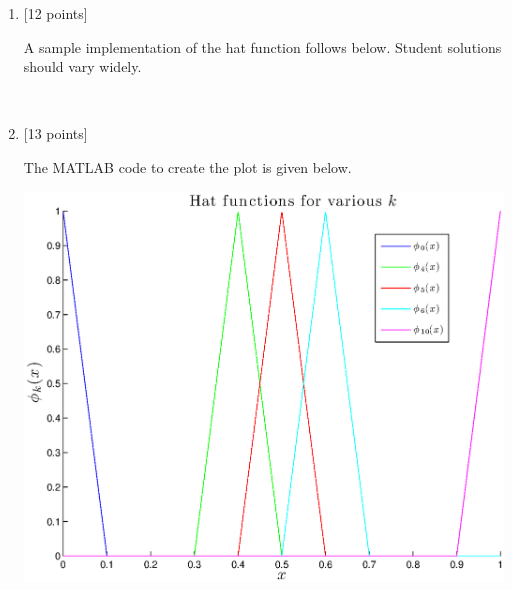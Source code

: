 \begin{solution}
\begin{enumerate}
\item {[12 points]}

A sample implementation of the hat function follows below. Student solutions should vary widely. 


\\
\item {[13 points]}

The MATLAB code to create the plot is given below.



\begin{center}
\includegraphics[scale=0.7]{hatfxnsplot.eps}
\end{center}


 
\end{enumerate}
\end{solution}

